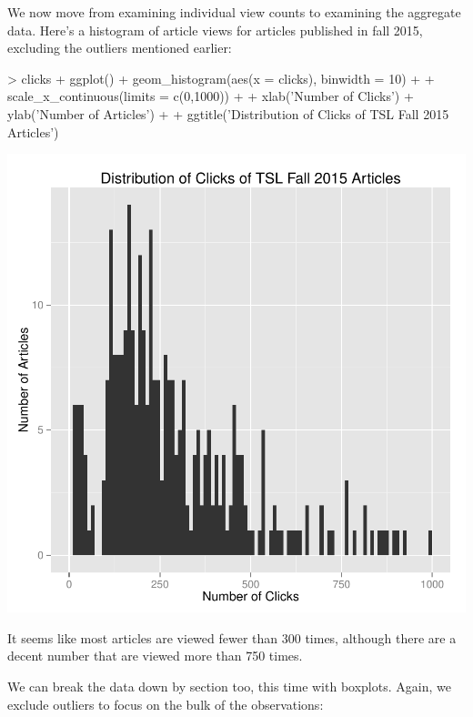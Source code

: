 \documentclass[a4paper]{article}
\begin{document}
We now move from examining individual view counts to examining the aggregate data. Here's a histogram of article views for articles published in fall 2015, excluding the outliers mentioned earlier:

\begin{Schunk}
\begin{Sinput}
> clicks %
+   ggplot() + geom_histogram(aes(x = clicks), binwidth = 10) +
+   scale_x_continuous(limits = c(0,1000)) +
+   xlab('Number of Clicks') + ylab('Number of Articles') + 
+   ggtitle('Distribution of Clicks of TSL Fall 2015 Articles')
\end{Sinput}
\end{Schunk}
\includegraphics{FinalProject-024}

It seems like most articles are viewed fewer than 300 times, although there are a decent number that are viewed more than 750 times.

We can break the data down by section too, this time with boxplots. Again, we exclude outliers to focus on the bulk of the observations:
\end{document}
